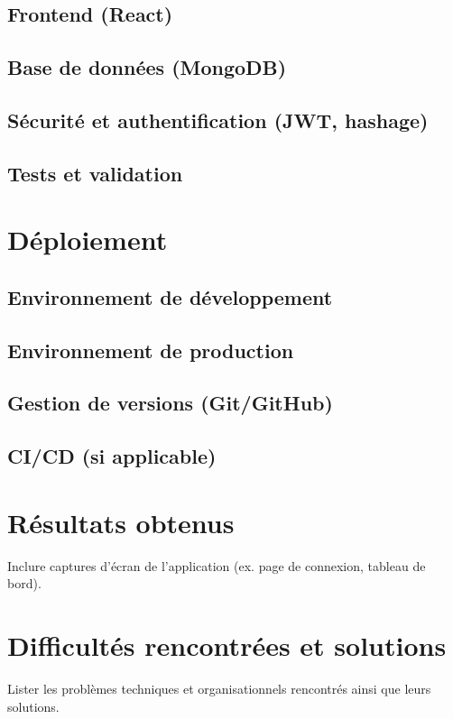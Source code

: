 \documentclass[12pt,a4paper]{report}
\begin{document}
\section{Frontend (React)}
\section{Base de données (MongoDB)}
\section{Sécurité et authentification (JWT, hashage)}
\section{Tests et validation}

\chapter{Déploiement}
\section{Environnement de développement}
\section{Environnement de production}
\section{Gestion de versions (Git/GitHub)}
\section{CI/CD (si applicable)}

\chapter{Résultats obtenus}
Inclure captures d’écran de l’application (ex. page de connexion, tableau de bord).  

\chapter{Difficultés rencontrées et solutions}
Lister les problèmes techniques et organisationnels rencontrés ainsi que leurs solutions.  
\end{document}
